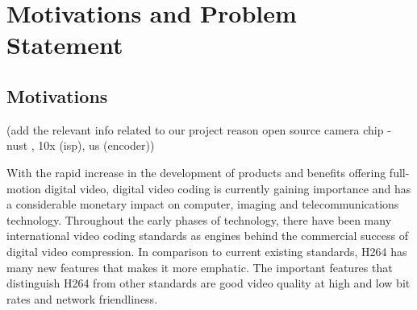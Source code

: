 
\chapter{Motivations and Problem Statement} %
\label{Chapter2}

\section{Motivations}

(add the relevant info related to our project reason open source camera chip - nust , 10x (isp), us (encoder))

With the rapid increase in the development of products and benefits offering full-motion digital video, digital video coding is currently gaining importance and has a considerable monetary impact on computer, imaging and telecommunications technology. Throughout the early phases of technology, there have been many international video coding standards as engines behind the commercial success of digital video compression. In comparison to current existing standards, H264 has many new features that makes it more emphatic. The important features that distinguish H264 from other standards are good video quality at high and low bit rates and network friendliness. 







